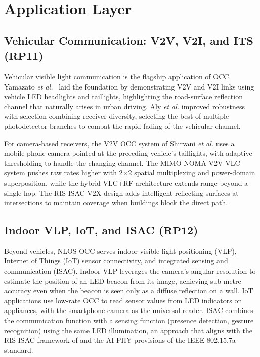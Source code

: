 \documentclass[10pt,a4paper]{article}
\newcommand{\rp}[1]{\textbf{RP#1}}
\begin{document}
\section{Application Layer}
\label{sec:applications}

\subsection{Vehicular Communication: V2V, V2I, and ITS ($\rp{11}$)}
\label{sec:rp11}

Vehicular visible light communication is the flagship application of
OCC. Yamazato \emph{et al.}~\cite{yamazato2014vehicular} laid the
foundation by demonstrating V2V and V2I links using vehicle LED
headlights and taillights, highlighting the road-surface reflection
channel that naturally arises in urban driving. Aly \emph{et al.}
\cite{aly2022vehicular} improved robustness with selection combining
receiver diversity, selecting the best of multiple photodetector
branches to combat the rapid fading of the vehicular channel.

For camera-based receivers, the V2V OCC system of Shirvani \emph{et al.}
\cite{shirvani2021adaptive} uses a mobile-phone camera pointed at the
preceding vehicle's taillights, with adaptive thresholding to handle the
changing channel. The MIMO-NOMA V2V-VLC system
\cite{mimonoma2025v2v} pushes raw rates higher with
2$\times$2 spatial multiplexing and power-domain superposition, while
the hybrid VLC+RF architecture \cite{okasha2022hybrid} extends range
beyond a single hop. The RIS-ISAC V2X design \cite{risisac2025v2x} adds
intelligent reflecting surfaces at intersections to maintain coverage
when buildings block the direct path.

\subsection{Indoor VLP, IoT, and ISAC ($\rp{12}$)}
\label{sec:rp12}

Beyond vehicles, NLOS-OCC serves indoor visible light positioning (VLP),
Internet of Things (IoT) sensor connectivity, and integrated sensing and
communication (ISAC). Indoor VLP leverages the camera's angular
resolution to estimate the position of an LED beacon from its image,
achieving sub-metre accuracy even when the beacon is seen only as a
diffuse reflection on a wall. IoT applications use low-rate OCC to read
sensor values from LED indicators on appliances, with the smartphone
camera as the universal reader. ISAC combines the communication function
with a sensing function (presence detection, gesture recognition) using
the same LED illumination, an approach that aligns with the RIS-ISAC
framework of \cite{risisac2025v2x} and the AI-PHY provisions of the
IEEE 802.15.7a standard.
\end{document}
